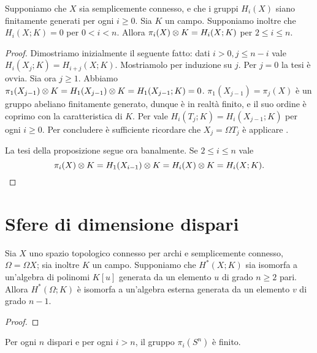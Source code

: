 \begin{proposition}
Supponiamo che $X$ sia semplicemente connesso, e che i gruppi $H_i(X)$ siano finitamente generati per ogni $i\ge 0$. Sia $K$ un campo. Supponiamo inoltre che $H_i(X;K)=0$ per $0<i<n$. Allora $\pi_i(X)\mathbin{\otimes} K=H_i(X;K)$ per $2\le i\le n$.
\end{proposition}
\begin{proof}
Dimostriamo inizialmente il seguente fatto: dati $i>0,j\le n-i$ vale $H_i(X_j;K)=H_{i+j}(X;K)$.
Mostriamolo per induzione su $j$. Per $j=0$ la tesi è ovvia. Sia ora $j\ge 1$. Abbiamo $\pi_1(X_{j-1})\mathbin{\otimes} K=H_1(X_{j-1})\mathbin{\otimes} K=H_1(X_{j-1};K)=0$. $\pi_1(X_{j-1})=\pi_j(X)$ è un gruppo abeliano finitamente generato, dunque è in realtà finito, e il suo ordine è coprimo con la caratteristica di $K$. Per \missing{} vale $H_i(T_j;K)=H_i(X_{j-1};K)$ per ogni $i\ge 0$. Per concludere è sufficiente ricordare che $X_j=\Omega T_j$ è applicare \missing{}.

La tesi della proposizione segue ora banalmente. Se $2\le i\le n$ vale
$$
\pi_i(X)\mathbin{\otimes} K=H_1(X_{i-1})\mathbin{\otimes} K=H_i(X)\mathbin{\otimes} K=H_i(X;K).
$$
\end{proof}

\section{Sfere di dimensione dispari}
\begin{lemma}
Sia $X$ uno spazio topologico connesso per archi e semplicemente connesso, $\Omega=\Omega X$; sia inoltre $K$ un campo. Supponiamo che $H^*(X;K)$ sia isomorfa a un'algebra di polinomi $K[u]$ generata da un elemento $u$ di grado $n\ge 2$ pari. Allora $H^*(\Omega;K)$ è isomorfa a un'algebra esterna generata da un elemento $v$ di grado $n-1$.
\end{lemma}
\begin{proof}

\end{proof}
\begin{proposition}
Per ogni $n$ dispari e per ogni $i>n$, il gruppo $\pi_i(S^n)$ è finito.
\end{proposition}
